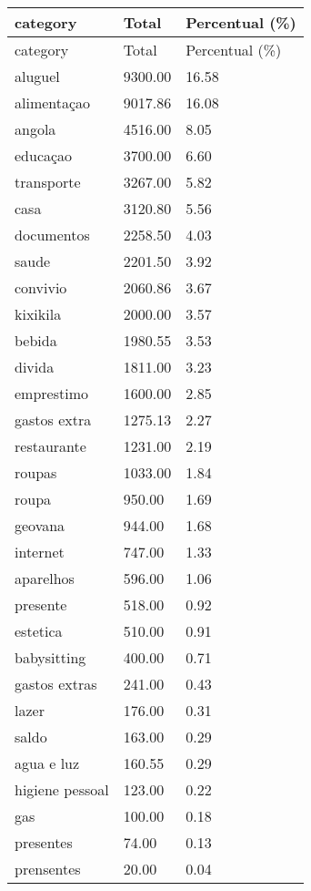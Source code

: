 \documentclass[
  8pt,
  a4paper,
  DIV=11,
  numbers=noendperiod]{scrartcl}
\begin{document}
\begin{figure}
\begin{minipage}{0.50\linewidth}
\begin{longtable}[]{@{}lll@{}}
\caption{}\label{T_82148}\tabularnewline
\toprule\noalign{}
category & Total & Percentual (\%) \\
\midrule\noalign{}
\endfirsthead
\toprule\noalign{}
category & Total & Percentual (\%) \\
\midrule\noalign{}
\endhead
\bottomrule\noalign{}
\endlastfoot
aluguel & 9300.00 & 16.58 \\
alimentaçao & 9017.86 & 16.08 \\
angola & 4516.00 & 8.05 \\
educaçao & 3700.00 & 6.60 \\
transporte & 3267.00 & 5.82 \\
casa & 3120.80 & 5.56 \\
documentos & 2258.50 & 4.03 \\
saude & 2201.50 & 3.92 \\
convivio & 2060.86 & 3.67 \\
kixikila & 2000.00 & 3.57 \\
bebida & 1980.55 & 3.53 \\
divida & 1811.00 & 3.23 \\
emprestimo & 1600.00 & 2.85 \\
gastos extra & 1275.13 & 2.27 \\
restaurante & 1231.00 & 2.19 \\
roupas & 1033.00 & 1.84 \\
roupa & 950.00 & 1.69 \\
geovana & 944.00 & 1.68 \\
internet & 747.00 & 1.33 \\
aparelhos & 596.00 & 1.06 \\
presente & 518.00 & 0.92 \\
estetica & 510.00 & 0.91 \\
babysitting & 400.00 & 0.71 \\
gastos extras & 241.00 & 0.43 \\
lazer & 176.00 & 0.31 \\
saldo & 163.00 & 0.29 \\
agua e luz & 160.55 & 0.29 \\
higiene pessoal & 123.00 & 0.22 \\
gas & 100.00 & 0.18 \\
presentes & 74.00 & 0.13 \\
prensentes & 20.00 & 0.04 \\
\end{longtable}


\end{minipage}
\end{figure}
\end{document}
